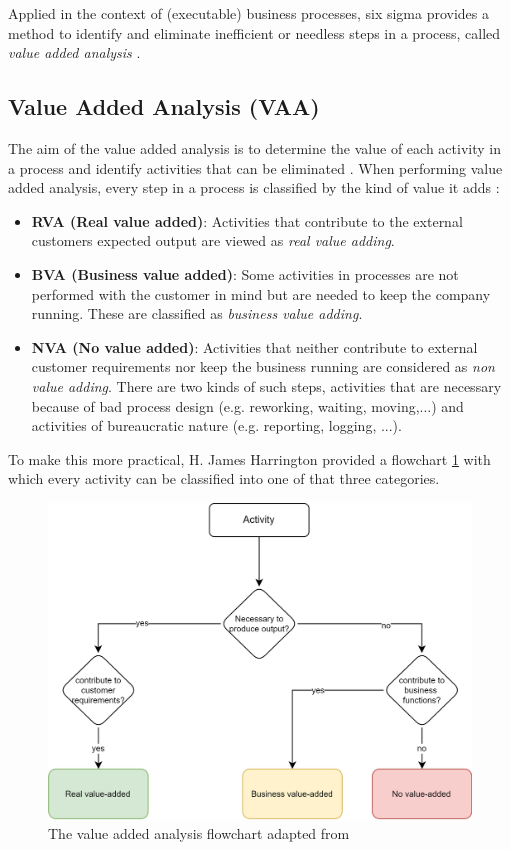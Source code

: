 Applied in the context of (executable) business processes, six sigma provides a method to identify and eliminate inefficient or needless steps in a process, called \textit{value added analysis} \cite{vom2014handbook}. 


\subsection{Value Added Analysis (VAA)}\label{vaa}

The aim of the value added analysis is to determine the value of each activity in a process and identify activities that can be eliminated \cite{fundamentals}\cite{harrington2016value}. When performing value added analysis, every step in a process is classified by the kind of value it adds \cite{harrington2016value}: 

\begin{itemize}
	\item \textbf{RVA (Real value added)}: Activities that contribute to the external customers expected output are viewed as \textit{real value adding}. 
	\item \textbf{BVA (Business value added)}: Some activities in processes are not performed with the customer in mind but are needed to keep the company running. These are classified as \textit{business value adding}.
	\item \textbf{NVA (No value added)}: Activities that neither contribute to external customer requirements nor keep the business running are considered as \textit{non value adding}. There are two kinds of such steps, activities that are necessary because of bad process design (e.g. reworking, waiting, moving,...) and activities of bureaucratic nature (e.g. reporting, logging, ...).
\end{itemize}

To make this more practical, H. James Harrington provided a flowchart \ref{fig:VAA-flow} with which every activity can be classified into one of that three categories\cite {harrington2016value}.

\begin{figure}[H]
	\centering
	\includegraphics[width=0.8\columnwidth]{graphics/VAA}
	\caption{The value added analysis flowchart adapted from \cite{harrington2016value}} 
	\label{fig:VAA-flow} 
\end{figure}

